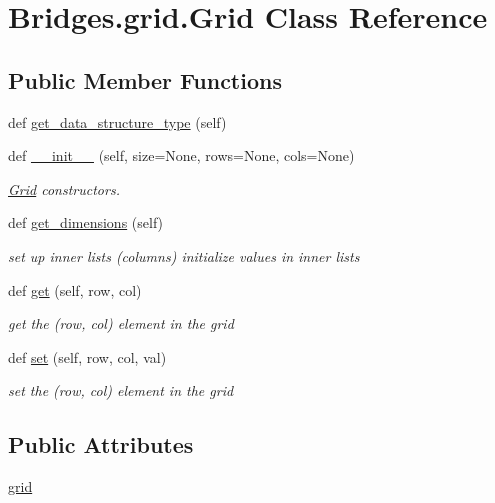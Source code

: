 \hypertarget{class_bridges_1_1grid_1_1_grid}{}\section{Bridges.\+grid.\+Grid Class Reference}
\label{class_bridges_1_1grid_1_1_grid}
\subsection*{Public Member Functions}
\begin{DoxyCompactItemize}
\item 
def \mbox{\hyperlink{class_bridges_1_1grid_1_1_grid_a0cb08704bb8f54b6f20329549e757fb6}{get\+\_\+data\+\_\+structure\+\_\+type}} (self)
\item 
def \mbox{\hyperlink{class_bridges_1_1grid_1_1_grid_a9ad9af0d8389956e458fb541225f47ce}{\+\_\+\+\_\+init\+\_\+\+\_\+}} (self, size=None, rows=None, cols=None)
\begin{DoxyCompactList}\small\item\em \mbox{\hyperlink{class_bridges_1_1grid_1_1_grid}{Grid}} constructors. \end{DoxyCompactList}\item 
def \mbox{\hyperlink{class_bridges_1_1grid_1_1_grid_af8fc8340800ea13079c61c41ce3a755c}{get\+\_\+dimensions}} (self)
\begin{DoxyCompactList}\small\item\em set up inner lists (columns) initialize values in inner lists \end{DoxyCompactList}\item 
def \mbox{\hyperlink{class_bridges_1_1grid_1_1_grid_a07a9aaa131b3bf32d02d996b533d765d}{get}} (self, row, col)
\begin{DoxyCompactList}\small\item\em get the (row, col) element in the grid \end{DoxyCompactList}\item 
def \mbox{\hyperlink{class_bridges_1_1grid_1_1_grid_ab55f697cf4c4d4e712b3ee4e08328d9c}{set}} (self, row, col, val)
\begin{DoxyCompactList}\small\item\em set the (row, col) element in the grid \end{DoxyCompactList}\end{DoxyCompactItemize}
\subsection*{Public Attributes}
\begin{DoxyCompactItemize}
\item 
\mbox{\hyperlink{class_bridges_1_1grid_1_1_grid_a4092dc06236eaac61aecc347b0b4b63e}{grid}}
\end{DoxyCompactItemize}
